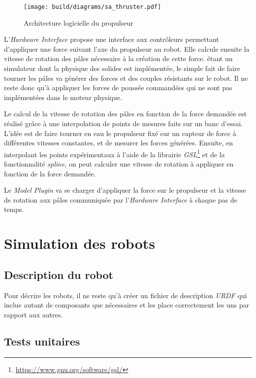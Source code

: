				\begin{figure}[!htb]
					\centering
					\texttt{[image: build/diagrams/sa\_thruster.pdf]}
					\caption{Architecture logicielle du propulseur}
					\label{fig:sa_thruster}
				\end{figure}
				
				L'\textit{Hardware Interface} propose une interface aux contrôleurs permettant d'appliquer une force suivant l'axe du propulseur au robot. Elle calcule ensuite la vitesse de rotation des pâles nécessaire à la création de cette force. \gazebo{} étant un simulateur dont la physique des solides est implémentée, le simple fait de faire tourner les pâles va générer des forces et des couples résistants sur le robot. Il ne reste donc qu'à appliquer les forces de poussée commandées qui ne sont pas implémentées dans le moteur physique.
				
				Le calcul de la vitesse de rotation des pâles en fonction de la force demandée est réalisé grâce à une interpolation de points de mesures faits sur un banc d'essai. L'idée est de faire tourner en eau le propulseur fixé sur un capteur de force à différentes vitesses constantes, et de mesurer les forces générées. Ensuite, en interpolant les points expérimentaux à l'aide de la librairie \textit{GSL}\footnote{\url{https://www.gnu.org/software/gsl/}} et de la fonctionnalité \textit{spline}, on peut calculer une vitesse de rotation à appliquer en fonction de la force demandée.
	
				Le \textit{Model Plugin} va se charger d'appliquer la force sur le propulseur et la vitesse de rotation aux pâles communiquée par l'\textit{Hardware Interface} à chaque pas de temps.

	\section{Simulation des robots}

		\subsection{Description du robot}

			Pour décrire les robots, il ne reste qu'à créer un fichier de description \textit{URDF} qui inclue autant de composants que nécessaires et les place correctement les uns par rapport aux autres.

		\subsection{Tests unitaires}
				
